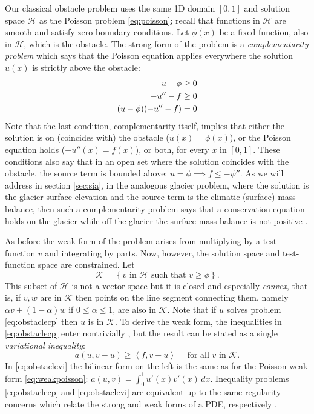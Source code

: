 \documentclass[letterpaper,final,12pt,reqno]{amsart}
\newcommand{\ip}[2]{\left<#1,#2\right>}
\begin{document}
Our classical obstacle problem uses the same 1D domain $[0,1]$ and solution space $\mathcal{H}$ as the Poisson problem \eqref{eq:poisson}; recall that functions in $\mathcal{H}$ are smooth and satisfy zero boundary conditions.  Let $\phi(x)$ be a fixed function, also in $\mathcal{H}$, which is the obstacle.  The strong form of the problem is a \emph{complementarity problem} \cite{Bueler2021,KinderlehrerStampacchia1980} which says that the Poisson equation applies everywhere the solution $u(x)$ is strictly above the obstacle:
\begin{align}
  u - \phi &\ge 0 \label{eq:obstaclecp} \\
  -u''-f &\ge 0 \notag \\
  (u-\phi)(-u''-f) &= 0 \notag
\end{align}
Note that the last condition, complementarity itself, implies that either the solution is on (coincides with) the obstacle ($u(x)=\phi(x)$), or the Poisson equation holds ($-u''(x)=f(x)$), or both, for every $x$ in $[0,1]$.  These conditions also say that in an open set where the solution coincides with the obstacle, the source term is bounded above: $u=\phi \implies f \le -\psi''$.  As we will address in section \ref{sec:sia}, in the analogous glacier problem, where the solution is the glacier surface elevation and the source term is the climatic (surface) mass balance, then such a complementarity problem says that a conservation equation holds on the glacier while off the glacier the surface mass balance is not positive \cite{Bueler2016}.

As before the weak form of the problem arises from multiplying by a test function $v$ and integrating by parts.  Now, however, the solution space and test-function space are constrained.  Let
\begin{equation}
\mathcal{K} = \left\{v \text{ in } \mathcal{H} \text{ such that } v \ge \phi\right\}.  \label{eq:Kdefine}
\end{equation}
This subset of $\mathcal{H}$ is not a vector space but it is closed and especially \emph{convex}, that is, if $v,w$ are in $\mathcal{K}$ then points on the line segment connecting them, namely $\alpha v + (1-\alpha) w$ if $0 \le \alpha \le 1$, are also in $\mathcal{K}$.  Note that if $u$ solves problem \eqref{eq:obstaclecp} then $u$ is in $\mathcal{K}$.  To derive the weak form, the inequalities in \eqref{eq:obstaclecp} enter nontrivially \cite[for example]{Bueler2020}, but the result can be stated as a single \emph{variational inequality}:
\begin{equation}
  a(u,v-u) \ge \ip{f}{v-u} \quad \text{ for all } v \text{ in } \mathcal{K}. \label{eq:obstaclevi}
\end{equation}
In \eqref{eq:obstaclevi} the bilinear form on the left is the same as for the Poisson weak form \eqref{eq:weakpoisson}: $a(u,v) = \int_0^1 u'(x) v'(x)\,dx$.  Inequality problems \eqref{eq:obstaclecp} and \eqref{eq:obstaclevi} are equivalent up to the same regularity concerns which relate the strong and weak forms of a PDE, respectively \cite{Evans2010}.
\end{document}

